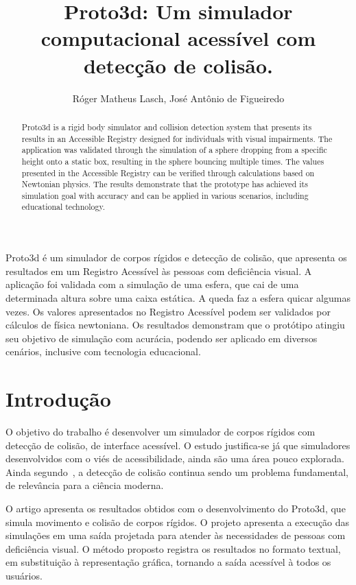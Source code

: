 \documentclass[12pt]{article}
\title{Proto3d: Um simulador computacional acessível com detecção de colisão.}
\author{Róger Matheus Lasch\inst{1}, José Antônio de Figueiredo\inst{1}}
\begin{document}
 

\maketitle

\begin{abstract}
Proto3d is a rigid body simulator and collision detection system that presents its results in an Accessible Registry designed for individuals with visual impairments. The application was validated through the simulation of a sphere dropping from a specific height onto a static box, resulting in the sphere bouncing multiple times. The values presented in the Accessible Registry can be verified through calculations based on Newtonian physics. The results demonstrate that the prototype has achieved its simulation goal with accuracy and can be applied in various scenarios, including educational technology.
\end{abstract}
     
\begin{resumo} 
Proto3d é um simulador de corpos rígidos e detecção de colisão, que apresenta os resultados em um Registro Acessível às pessoas com deficiência visual. A aplicação foi validada com a simulação de uma esfera, que cai de uma determinada altura sobre uma caixa estática. A queda faz a esfera quicar algumas vezes. Os valores apresentados no Registro Acessível podem ser validados por cálculos de física newtoniana. Os resultados demonstram que o protótipo atingiu seu objetivo de simulação com acurácia, podendo ser aplicado em diversos cenários, inclusive com tecnologia educacional.
\end{resumo}

\section{Introdução}
O objetivo do trabalho é desenvolver um simulador de corpos rígidos com detecção de colisão, de interface acessível. O estudo justifica-se já que simuladores desenvolvidos com o viés de acessibilidade, ainda são uma área pouco explorada. Ainda segundo~\cite{ericson2004real}, a detecção de colisão continua sendo um problema fundamental, de relevância para a ciência moderna.

O artigo apresenta os resultados obtidos com o desenvolvimento do Proto3d, que simula movimento e colisão de corpos rígidos. O projeto apresenta a execução das simulações em uma saída projetada para atender às necessidades de pessoas com deficiência visual. O método proposto registra os resultados no formato textual, em substituição à representação gráfica, tornando a saída acessível à todos os usuários.
\end{document}
